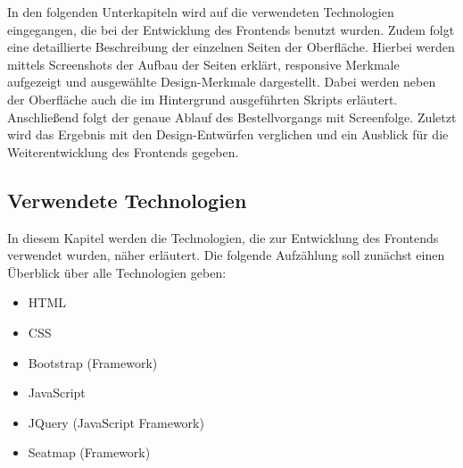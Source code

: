 	    In den folgenden Unterkapiteln wird auf die verwendeten Technologien eingegangen, die bei der Entwicklung des Frontends benutzt wurden. Zudem folgt eine detaillierte Beschreibung der einzelnen Seiten der Oberfläche. Hierbei werden mittels Screenshots der Aufbau der Seiten erklärt, responsive Merkmale aufgezeigt und ausgewählte Design-Merkmale dargestellt. Dabei werden neben der Oberfläche auch die im Hintergrund ausgeführten Skripts erläutert. Anschließend folgt der genaue Ablauf des Bestellvorgangs mit Screenfolge. Zuletzt wird das Ergebnis mit den Design-Entwürfen verglichen und ein Ausblick für die Weiterentwicklung des Frontends gegeben.
	    
	    \subsection{Verwendete Technologien} \label{verwendeteTechnologien}
	    In diesem Kapitel werden die Technologien, die zur Entwicklung des Frontends verwendet wurden, näher erläutert. Die folgende Aufzählung soll zunächst einen Überblick über alle Technologien geben:
	    \begin{singlespacing}
	    \begin{itemize}
	        \setlength\itemsep{-0.8em}
	        \item HTML
	        \item \acs{CSS}
	        \item Bootstrap (Framework)
	        \item JavaScript
	        \item JQuery (JavaScript Framework)
	        \item Seatmap (Framework)
	    \end{itemize}
	     \end{singlespacing}
	    
